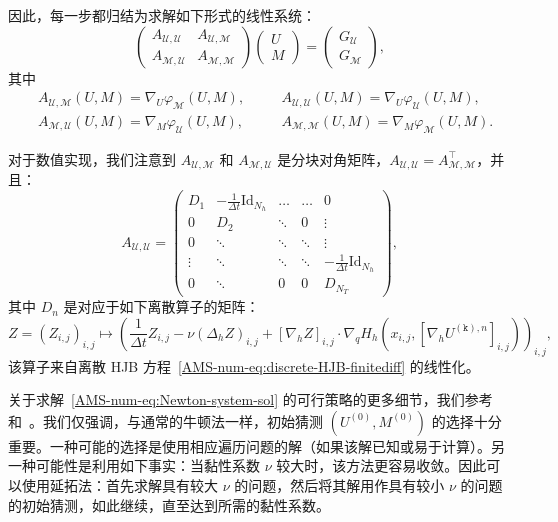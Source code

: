 \documentclass{amsproc}
\theoremstyle{definition}
\theoremstyle{remark}
\numberwithin{equation}{section}
\newcommand{\cM}{{\mathcal M}}
\newcommand{\cU}{{\mathcal U}}
\newcommand{\Id}{\mathrm{Id}}
\begin{document}
因此，每一步都归结为求解如下形式的线性系统：
\begin{equation}
\label{AMS-num-eq:Newton-system-sol}
	\begin{pmatrix}
		A_{\cU,\cU} & A_{\cU,\cM}
		\\
		A_{\cM,\cU} & A_{\cM,\cM}
	\end{pmatrix}
	\begin{pmatrix}
		U
		\\
		M
	\end{pmatrix}
	=
	\begin{pmatrix}
		G_{\cU}
		\\
		G_{\cM}
	\end{pmatrix},
\end{equation}
其中
\begin{align*}
	&A_{\cU,\cM}(U,M) = \nabla_{U} \varphi_{\cM}(U,M), 
	\quad &&A_{\cU,\cU}(U,M) = \nabla_{U} \varphi_{\cU}(U,M), 
	\\ 
	&A_{\cM,\cU}(U,M) = \nabla_{M} \varphi_{\cU}(U,M), 
	\quad &&A_{\cM,\cM}(U,M) = \nabla_{M} \varphi_{\cM}(U,M). 
\end{align*}


对于数值实现，我们注意到 $A_{\cU, \cM}$ 和 $A_{\cM, \cU}$ 是分块对角矩阵，$A_{\cU, \cU} = A_{\cM, \cM}^\top$，并且：
$$
	A_{\cU, \cU}
	=
	\begin{pmatrix}
	D_1 & -\frac{1}{\Delta t}\Id_{N_h} & \dots & \dots & 0 
	\\
	0 & D_2 & \ddots & 0 & \vdots 
	\\
	0 & \ddots & \ddots & \ddots & \vdots
	\\
	\vdots & \ddots & \ddots & \ddots & -\frac{1}{\Delta t}\Id_{N_h}
	\\
	0 & \ddots & 0 & 0 & D_{N_T}
	\end{pmatrix},
$$
其中 $D_n$ 是对应于如下离散算子的矩阵：
$$
	Z = (Z_{i,j})_{i,j}
	\mapsto
	\left( \frac{1}{\Delta t} Z_{i,j} - \nu (\Delta_h Z)_{i,j} + [\nabla_h Z]_{i,j} \cdot \nabla_q H_h(x_{i,j}, [\nabla_h U^{(\mathtt{k}), n}]_{i,j})
	\right)_{i,j},
$$
该算子来自离散 HJB 方程~\eqref{AMS-num-eq:discrete-HJB-finitediff} 的线性化。 

关于求解~\eqref{AMS-num-eq:Newton-system-sol} 的可行策略的更多细节，我们参考~\cite[Section 4]{MR3135339} 和~\cite{MR2928376}。我们仅强调，与通常的牛顿法一样，初始猜测 $(U^{(0)}, M^{(0)})$ 的选择十分重要。一种可能的选择是使用相应遍历问题的解（如果该解已知或易于计算）。另一种可能性是利用如下事实：当黏性系数 $\nu$ 较大时，该方法更容易收敛。因此可以使用延拓法：首先求解具有较大 $\nu$ 的问题，然后将其解用作具有较小 $\nu$ 的问题的初始猜测，如此继续，直至达到所需的黏性系数。
\end{document}
